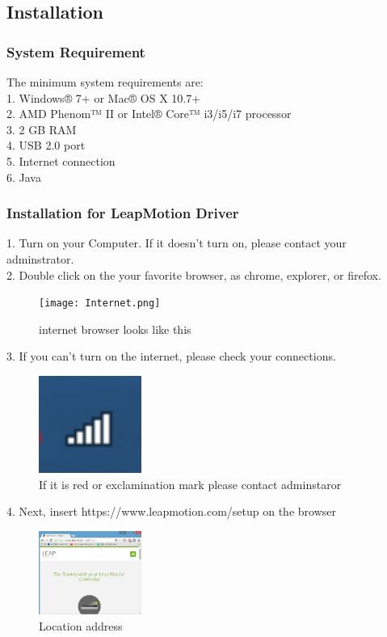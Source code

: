 \documentclass[10pt,journal,compsoc]{IEEEtran}
\begin{document}
\subsection{Installation}
\subsubsection{System Requirement}
The minimum system requirements are:\\
1. Windows® 7+ or Mac® OS X 10.7+\\
2. AMD Phenom™ II or Intel® Core™ i3/i5/i7 processor\\
3. 2 GB RAM\\
4. USB 2.0 port\\
5. Internet connection\\
6. Java 
\subsubsection{Installation for LeapMotion Driver}
1. Turn on your Computer. If it doesn't turn on, please contact your adminstrator.\\
2. Double click on the your favorite browser, as chrome, explorer, or firefox.\\ 

\begin{figure}[H]
\centering
\texttt{[image: Internet.png]}
{\caption*{internet browser looks like this}}
\end{figure}
3. If you can't turn on the internet, please check your connections.\\ 
\begin{figure}[H]
\centering
\includegraphics[width=0.3\textwidth]{Connection.png}
{\caption*{If it is red or exclamination mark
		  please contact adminstaror }}
\end{figure}

4. Next, insert https://www.leapmotion.com/setup  on the browser\\
\begin{figure}[H]
\centering
\includegraphics[width=0.3\textwidth]{address.png}
{\caption*{Location address}}
\end{figure}
\end{document}
